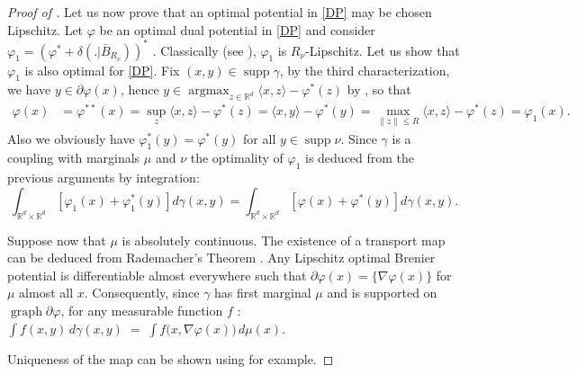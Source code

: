 \documentclass[11pt]{article}
\DeclareMathOperator{\argmax}{argmax}
\DeclareMathOperator{\supp}{supp}
\DeclareMathOperator{\graph}{graph}
\newcommand{\R}{\mathbb R}
\newcommand{\1}{\mathbbm{1}}
\numberwithin{equation}{section}
\begin{document}
\begin{proof}[Proof of ]
    
    Let us now prove that an optimal potential in \eqref{DP} may be chosen Lipschitz. Let $\varphi$ be an optimal dual potential in \eqref{DP} and consider $\varphi_1=(\varphi^*+\delta(.|\bar{B}_{R_\nu}))^*$ . Classically (see \cite[Theorems 23.5 and 24.7]{rockafellar1970convex}), $\varphi_1$ is $R_\nu$-Lipschitz.
    Let us show that $\varphi_1$ is also optimal for \eqref{DP}. Fix $(x,y)\in\supp \gamma$, by the third characterization, we have $y\in\partial\varphi(x)$, hence $y\in\argmax_{z\in \R^d}\langle x,z \rangle-\varphi^*(z)$ by \cite[Theorem 23.5]{rockafellar1970convex}, so that
    \begin{equation*}
        \begin{split}
            \varphi(x)&=\varphi^{**}(x)= \sup_{z}\langle x,z \rangle-\varphi^*(z) = \langle x,y \rangle-\varphi^*(y) = \max_{\|z\|\leq R}\langle x,z \rangle-\varphi^*(z)
            =\varphi_1(x).
        \end{split}
    \end{equation*}
    Also we obviously have $\varphi_1^*(y)=\varphi^*(y)$ for all $y\in \supp \nu$. Since $\gamma$ is a coupling with marginals $\mu$ and $\nu$ the optimality of $\varphi_1$ is deduced from the previous arguments by integration: 
    \begin{equation*}
        \int_{\R^d\times \R^d}[\varphi_1(x)+\varphi_1^*(y)]  d\gamma(x,y)=\int_{\R^d\times\R^d} [\varphi(x)+\varphi^*(y)]d\gamma(x,y).
    \end{equation*}
    
    

    Suppose now that $\mu$ is absolutely continuous. The existence of a transport map  can be deduced from Rademacher's Theorem \cite[Theorem 1.17]{book_santambrogio}. Any Lipschitz optimal Brenier potential is differentiable almost everywhere such that $\partial \varphi(x) = \{\nabla \varphi(x)\}$ for $\mu$ almost all $x$. Consequently, since $\gamma$ has first marginal $\mu$ and is supported on $\graph \partial \varphi$, for any measurable function $f$ : $    \int f(x,y)\, d\gamma(x,y) \;=\; \int f\bigl(x,\nabla \varphi(x)\bigr)\, d\mu(x).$

    Uniqueness of the map can be shown using \cite[Remark 1.19]{book_santambrogio} for example. 
\end{proof}
\end{document}
